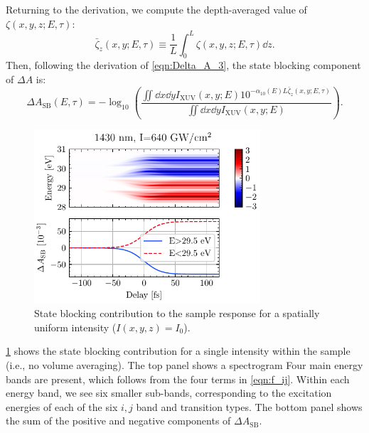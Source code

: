 Returning to the derivation, we compute the depth-averaged value of $\zeta(x,y,z;E,\tau)$:
\begin{equation}
\bar{\zeta}_z(x, y; E, \tau) \equiv \frac{1}{L} \int_{0}^{L} \zeta(x,y,z;E,\tau) \dd{z}.
\label{eqn:zeta_z}
\end{equation}
Then, following the derivation of \cref{eqn:Delta_A_3}, the state blocking component of $\Delta A$ is:
\begin{equation}
\Delta A_{\textrm{SB}} (E, \tau) = -\log_{10} \left( \frac{ \iint \dd{x} \dd{y} I_{\textrm{XUV}}(x,y;E) 10^{- \alpha_{10}(E) L \bar{\zeta}_z(x,y;E,\tau)}}{ \iint \dd{x} \dd{y} I_{\textrm{XUV}}(x,y;E)} \right).
\label{eqn:Delta_A_4}
\end{equation}

\begin{figure}
	\centering
	\includegraphics[width=0.75\textwidth]{figures/chap4/dA_SB_1430nm_640GWcm2.pdf}
	\caption{State blocking contribution to the sample response for a spatially uniform intensity ($I(x,y,z)=I_0$).}
	\label{fig:dA_SB_1430nm_640GWcm2}
\end{figure}

\cref{fig:dA_SB_1430nm_640GWcm2} shows the state blocking contribution for a single intensity within the sample (i.e., no volume averaging). The top panel shows a spectrogram Four main energy bands are present, which follows from the four terms in \cref{eqn:f_ij}. Within each energy band, we see six smaller sub-bands, corresponding to the excitation energies of each of the six $i,j$ band and transition types. The bottom panel shows the sum of the positive and negative components of $\Delta A_{\textrm{SB}}$.

